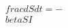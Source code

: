 \documentclass[preview]{standalone}
\begin{document}
\begin{align*}
\quad\\frac{dS}{dt} = -\quad\\beta S I
\end{align*}
\end{document}
